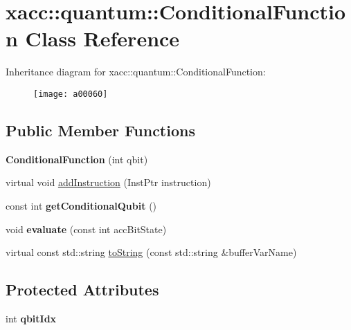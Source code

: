 \hypertarget{a00060}{}\section{xacc\+:\+:quantum\+:\+:Conditional\+Function Class Reference}
\label{a00060}
Inheritance diagram for xacc\+:\+:quantum\+:\+:Conditional\+Function\+:\begin{figure}[H]
\begin{center}
\leavevmode
\texttt{[image: a00060]}
\end{center}
\end{figure}
\subsection*{Public Member Functions}
\begin{DoxyCompactItemize}
\item 
{\bfseries Conditional\+Function} (int qbit)\hypertarget{a00060_aa28610a08ae04d62ccdd8359433100c3}{}\label{a00060_aa28610a08ae04d62ccdd8359433100c3}

\item 
virtual void \hyperlink{a00060_a6aedad20f96390880efdc0a476b3273f}{add\+Instruction} (Inst\+Ptr instruction)
\item 
const int {\bfseries get\+Conditional\+Qubit} ()\hypertarget{a00060_a804317333b6677a041a3071b5108c0df}{}\label{a00060_a804317333b6677a041a3071b5108c0df}

\item 
void {\bfseries evaluate} (const int acc\+Bit\+State)\hypertarget{a00060_a709c236a5beb62d9a3bd5265196fb6c9}{}\label{a00060_a709c236a5beb62d9a3bd5265196fb6c9}

\item 
virtual const std\+::string \hyperlink{a00060_aca7a5f849fece6fc28a904efee9a3370}{to\+String} (const std\+::string \&buffer\+Var\+Name)
\end{DoxyCompactItemize}
\subsection*{Protected Attributes}
\begin{DoxyCompactItemize}
\item 
int {\bfseries qbit\+Idx}\hypertarget{a00060_a0310536801417c0eded28a4dea1efa44}{}\label{a00060_a0310536801417c0eded28a4dea1efa44}

\end{DoxyCompactItemize}
